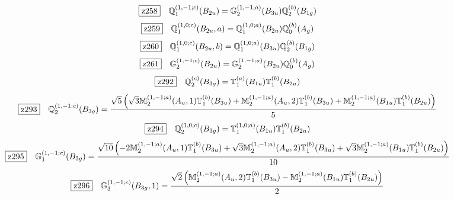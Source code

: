 \documentclass[fleqn,10pt,landscape]{jsarticle}
\begin{document}
\begin{dmath*}
\hspace*{3mm}\fbox{z258}\quad \mathbb{Q}_{1}^{(1,-1;c)}(B_{2u})=\mathbb{G}_{2}^{(1,-1;a)}(B_{3u}) \mathbb{Q}_{2}^{(b)}(B_{1g})
\end{dmath*}
\begin{dmath*}
\hspace*{3mm}\fbox{z259}\quad \mathbb{Q}_{1}^{(1,0;c)}(B_{2u},a)=\mathbb{Q}_{1}^{(1,0;a)}(B_{2u}) \mathbb{Q}_{0}^{(b)}(A_{g})
\end{dmath*}
\begin{dmath*}
\hspace*{3mm}\fbox{z260}\quad \mathbb{Q}_{1}^{(1,0;c)}(B_{2u},b)=\mathbb{Q}_{1}^{(1,0;a)}(B_{3u}) \mathbb{Q}_{2}^{(b)}(B_{1g})
\end{dmath*}
\begin{dmath*}
\hspace*{3mm}\fbox{z261}\quad \mathbb{G}_{2}^{(1,-1;c)}(B_{2u})=\mathbb{G}_{2}^{(1,-1;a)}(B_{2u}) \mathbb{Q}_{0}^{(b)}(A_{g})
\end{dmath*}
\begin{dmath*}
\hspace*{3mm}\fbox{z292}\quad \mathbb{Q}_{2}^{(c)}(B_{3g})=\mathbb{T}_{1}^{(a)}(B_{1u}) \mathbb{T}_{1}^{(b)}(B_{2u})
\end{dmath*}
\begin{dmath*}
\hspace*{3mm}\fbox{z293}\quad \mathbb{Q}_{2}^{(1,-1;c)}(B_{3g})=\frac{\sqrt{5} \left(\sqrt{3} \mathbb{M}_{2}^{(1,-1;a)}(A_{u},1) \mathbb{T}_{1}^{(b)}(B_{3u}) + \mathbb{M}_{2}^{(1,-1;a)}(A_{u},2) \mathbb{T}_{1}^{(b)}(B_{3u}) + \mathbb{M}_{2}^{(1,-1;a)}(B_{1u}) \mathbb{T}_{1}^{(b)}(B_{2u})\right)}{5}
\end{dmath*}
\begin{dmath*}
\hspace*{3mm}\fbox{z294}\quad \mathbb{Q}_{2}^{(1,0;c)}(B_{3g})=\mathbb{T}_{1}^{(1,0;a)}(B_{1u}) \mathbb{T}_{1}^{(b)}(B_{2u})
\end{dmath*}
\begin{dmath*}
\hspace*{3mm}\fbox{z295}\quad \mathbb{G}_{1}^{(1,-1;c)}(B_{3g})=\frac{\sqrt{10} \left(- 2 \mathbb{M}_{2}^{(1,-1;a)}(A_{u},1) \mathbb{T}_{1}^{(b)}(B_{3u}) + \sqrt{3} \mathbb{M}_{2}^{(1,-1;a)}(A_{u},2) \mathbb{T}_{1}^{(b)}(B_{3u}) + \sqrt{3} \mathbb{M}_{2}^{(1,-1;a)}(B_{1u}) \mathbb{T}_{1}^{(b)}(B_{2u})\right)}{10}
\end{dmath*}
\begin{dmath*}
\hspace*{3mm}\fbox{z296}\quad \mathbb{G}_{3}^{(1,-1;c)}(B_{3g},1)=\frac{\sqrt{2} \left(\mathbb{M}_{2}^{(1,-1;a)}(A_{u},2) \mathbb{T}_{1}^{(b)}(B_{3u}) - \mathbb{M}_{2}^{(1,-1;a)}(B_{1u}) \mathbb{T}_{1}^{(b)}(B_{2u})\right)}{2}
\end{dmath*}
\end{document}
